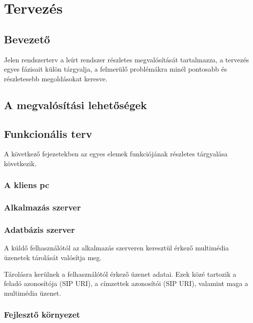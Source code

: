

\section{Tervezés}

\subsection{Bevezető}

Jelen rendszerterv a leírt rendszer részletes megvalósítását
tartalmazza, a tervezés egyes fázisait külön tárgyalja, a felmerülő
problémákra minél pontosabb és részletesebb megoldásokat keresve.

\subsection{A megvalósítási lehetőségek}

\subsection{Funkcionális terv}


A következő fejezetekben az egyes elemek funkciójának részletes tárgyalása
következik.

\subsubsection{A kliens pc}
\label{sec:kliens_pc}


\subsubsection{Alkalmazás szerver}


\subsubsection{Adatbázis szerver}
\label{sec:adatbszerver}

A küldő felhasználótól az alkalmazás szerveren keresztül érkező
multimédia üzenetek tárolását valósítja meg.

Tárolásra kerülnek a felhasználótól érkező üzenet adatai. Ezek közé tartozik
a feladó azonosítója (SIP URI), a címzettek azonosítói (SIP URI), valamint maga a multimédia üzenet.

\subsubsection{Fejlesztő környezet}

